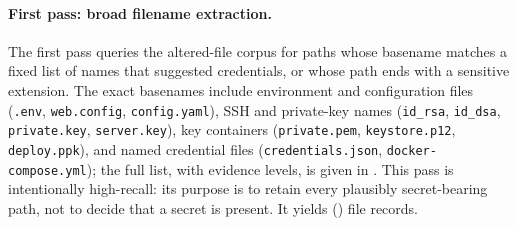 \paragraph{First pass: broad filename extraction.}
The first pass queries the altered-file corpus for paths whose basename matches a fixed list of names that suggested credentials, or whose path ends with a sensitive extension.
The exact basenames include environment and configuration files (\texttt{.env}, \texttt{web.config}, \texttt{config.yaml}), SSH and private-key names (\texttt{id\_rsa}, \texttt{id\_dsa}, \texttt{private.key}, \texttt{server.key}), key containers (\texttt{private.pem}, \texttt{keystore.p12}, \texttt{deploy.ppk}), and named credential files (\texttt{credentials.json}, \texttt{docker-compose.yml}); the full list, with evidence levels, is given in .
This pass is intentionally high-recall: its purpose is to retain every plausibly secret-bearing path, not to decide that a secret is present.
It yields \SecretFirstExtractionShort (\SecretFirstExtraction) file records.

